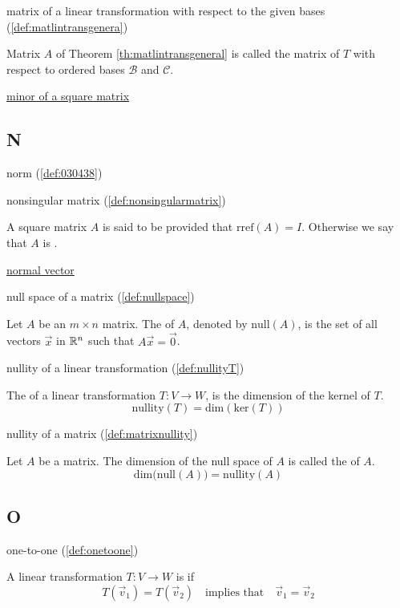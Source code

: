 \documentclass{ximera}
\begin{document}
matrix of a linear transformation with respect to the given bases (\ref{def:matlintransgenera})
\begin{expandable}
    Matrix $A$ of Theorem \ref{th:matlintransgeneral} is called the matrix of $T$ with respect to ordered bases $\mathcal{B}$ and $\mathcal{C}$.
\end{expandable}


\href{https://ximera.osu.edu/oerlinalg/LinearAlgebra/DET-0010/main}{minor of a square matrix}

\subsection{N}


norm (\ref{def:030438})


nonsingular matrix (\ref{def:nonsingularmatrix})
\begin{expandable}
    A square matrix $A$ is said to be  provided that $\mbox{rref}(A)=I$.  Otherwise we say that $A$ is .
\end{expandable}

\href{https://ximera.osu.edu/oerlinalg/LinearAlgebra/RRN-0030/main}{normal vector}

null space of a matrix (\ref{def:nullspace})
\begin{expandable}
    Let $A$ be an $m\times n$ matrix.  The  of $A$, denoted by $\mbox{null}(A)$, is the set of all vectors $\vec{x}$ in $\mathbb{R}^n$ such that $A\vec{x}=\vec{0}$.
\end{expandable}

nullity of a linear transformation (\ref{def:nullityT})
\begin{expandable}
    The  of a linear transformation $T:V\rightarrow W$, is the dimension of the kernel of $T$.
$$\mbox{nullity}(T)=\mbox{dim}(\mbox{ker}(T))$$
\end{expandable}

nullity of a matrix (\ref{def:matrixnullity})
\begin{expandable}
    Let $A$ be a matrix.  The dimension of the null space of $A$ is called the  of $A$.
$$\mbox{dim}\Big(\mbox{null}(A)\Big)=\mbox{nullity}(A)$$
\end{expandable}


\subsection{O}
one-to-one (\ref{def:onetoone})
\begin{expandable}
    A linear transformation $T:V\rightarrow W$ is  if 
$$T(\vec{v}_1)=T(\vec{v}_2)\quad \text{implies that}\quad \vec{v}_1=\vec{v}_2$$
\end{expandable}
\end{document}

